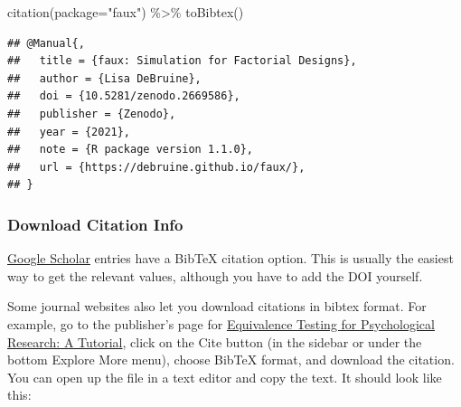 \documentclass[
  oneside]{book}
\newenvironment{Shaded}{\begin{snugshade}}{\end{snugshade}}
\newcommand{\AttributeTok}[1]{\textcolor[rgb]{0.77,0.63,0.00}{#1}}
\newcommand{\FunctionTok}[1]{\textcolor[rgb]{0.00,0.00,0.00}{#1}}
\newcommand{\NormalTok}[1]{#1}
\newcommand{\SpecialCharTok}[1]{\textcolor[rgb]{0.00,0.00,0.00}{#1}}
\newcommand{\StringTok}[1]{\textcolor[rgb]{0.31,0.60,0.02}{#1}}
\begin{document}
\begin{Shaded}
\begin{Highlighting}[]
\FunctionTok{citation}\NormalTok{(}\AttributeTok{package=}\StringTok{"faux"}\NormalTok{) }\SpecialCharTok{\%\textgreater{}\%} \FunctionTok{toBibtex}\NormalTok{()}
\end{Highlighting}
\end{Shaded}

\begin{verbatim}
## @Manual{,
##   title = {faux: Simulation for Factorial Designs},
##   author = {Lisa DeBruine},
##   doi = {10.5281/zenodo.2669586},
##   publisher = {Zenodo},
##   year = {2021},
##   note = {R package version 1.1.0},
##   url = {https://debruine.github.io/faux/},
## }
\end{verbatim}

\hypertarget{download-citation-info}{%
\subsubsection{Download Citation Info}\label{download-citation-info}}

\href{https://scholar.google.com/}{Google Scholar} entries have a BibTeX citation option. This is usually the easiest way to get the relevant values, although you have to add the DOI yourself.

Some journal websites also let you download citations in bibtex format. For example, go to the publisher's page for \href{https://journals.sagepub.com/doi/abs/10.1177/2515245918770963}{Equivalence Testing for Psychological Research: A Tutorial}, click on the Cite button (in the sidebar or under the bottom Explore More menu), choose BibTeX format, and download the citation. You can open up the file in a text editor and copy the text. It should look like this:
\end{document}
